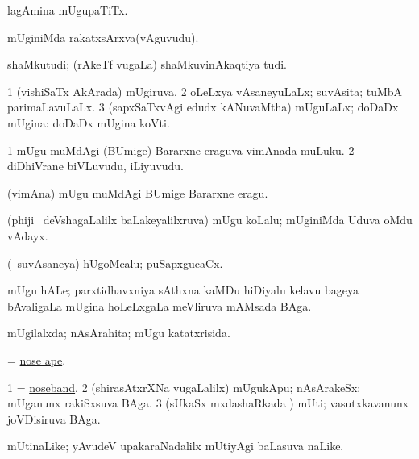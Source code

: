 \bentry
{}
\gl{\nA}
\bmng
lagAmina mUgupaTiTx. 
\emng
\eentry

\bentry
{}
\gl{\nA}
\bmng
mUginiMda rakatxsArxva(vAguvudu). 
\emng
\eentry

\bentry
{}
\gl{\nA}
\bmng
shaMkutudi; (rAkeTf \mo vugaLa) shaMkuvinAkaqtiya tudi. 
\emng
\eentry

\bentry
{}
\gl{\gu}
\bmng
\bnum
\num{1} (vishiSaTx AkArada) mUgiruva. 
\num{2} oLeLxya vAsaneyuLaLx; suvAsita; tuMbA parimaLavuLaLx. 
\num{3} (sapxSaTxvAgi edudx kANuvaMtha) mUguLaLx; doDaDx mUgina:  doDaDx mUgina koVti. 
\enum
\emng
\eentry

\bentry
{}
\gl{\nA}
\bmng
\bnum
\num{1} mUgu muMdAgi (BUmige) Bararxne eraguva vimAnada muLuku. 
\num{2} diDhiVrane biVLuvudu, iLiyuvudu. 
\enum
\emng
\eentry

\bentry
{}
\gl{\akirx}
\bmng
(vimAna) mUgu muMdAgi BUmige Bararxne eragu. 
\emng
\eentry

\bentry
{}
\gl{\nA}
\bmng
(phiji \mo\ deVshagaLalilx baLakeyalilxruva) mUgu koLalu; mUginiMda Uduva oMdu vAdayx. 
\emng
\eentry

\bentry
{}
\gl{\nA}
\bmng
(\sA\ suvAsaneya) hUgoMcalu; puSapxgucaCx. 
\emng
\eentry

\bentry
{}
\gl{\nA}
\bmng
mUgu hALe; parxtidhavxniya sAthxna kaMDu hiDiyalu kelavu bageya bAvaligaLa mUgina hoLeLxgaLa meVliruva mAMsada BAga. 
\emng
\eentry

\bentry
{}
\gl{\gu}
\bmng
mUgilalxda; nAsArahita; mUgu katatxrisida. 
\emng
\eentry

\bentry
{}
\gl{\nA}
\bmng
= \hyperlink{nose ape}{nose ape}. 
\emng
\eentry

\bentry
{}
\gl{\nA}
\bmng
\bnum
\num{1} = \hyperlink{noseband}{noseband}. 
\num{2} (shirasAtxrXNa \mo vugaLalilx) mUgukApu; nAsArakeSx; mUganunx rakiSxsuva BAga. 
\num{3} (sUkaSx mxdashaRkada \vi) mUti; vasutxkavanunx  joVDisiruva BAga. 
\enum
\emng
\eentry

\bentry
{}
\gl{\nA}
\bmng
mUtinaLike; yAvudeV upakaraNadalilx mUtiyAgi baLasuva naLike. 
\emng
\eentry

